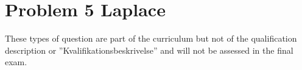 \section*{Problem 5 Laplace}
These types of question are part of the curriculum but not of the qualification
description or ”Kvalifikationsbeskrivelse” and will not be assessed in the
final exam.
